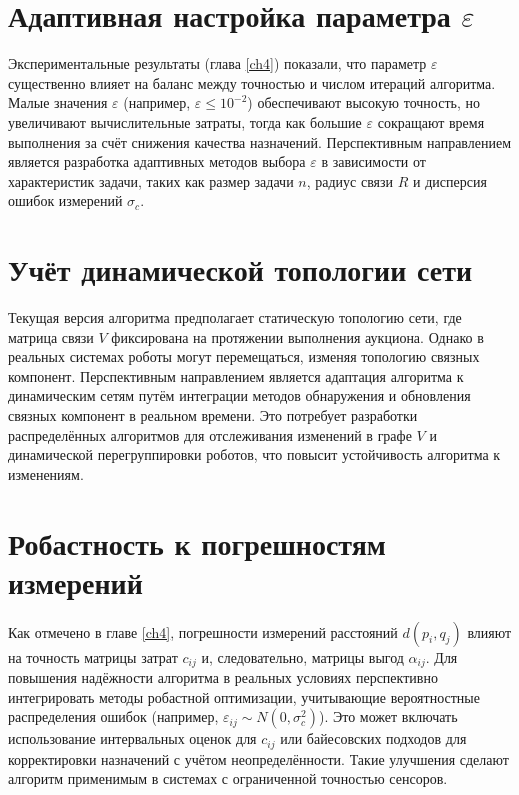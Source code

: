 \section{Адаптивная настройка параметра $\varepsilon$}
Экспериментальные результаты (глава \ref{ch4}) показали, что параметр $\varepsilon$ существенно влияет на баланс между точностью и числом итераций алгоритма. Малые значения $\varepsilon$ (например, $\varepsilon \leqslant 10^{-2}$) обеспечивают высокую точность, но увеличивают вычислительные затраты, тогда как большие $\varepsilon$ сокращают время выполнения за счёт снижения качества назначений. Перспективным направлением является разработка адаптивных методов выбора $\varepsilon$ в зависимости от характеристик задачи, таких как размер задачи $n$, радиус связи $R$ и дисперсия ошибок измерений $\sigma_c$. 

\section{Учёт динамической топологии сети}
Текущая версия алгоритма предполагает статическую топологию сети, где матрица связи $V$ фиксирована на протяжении выполнения аукциона. Однако в реальных системах роботы могут перемещаться, изменяя топологию связных компонент. Перспективным направлением является адаптация алгоритма к динамическим сетям путём интеграции методов обнаружения и обновления связных компонент в реальном времени. Это потребует разработки распределённых алгоритмов для отслеживания изменений в графе $V$ и динамической перегруппировки роботов, что повысит устойчивость алгоритма к изменениям.

\section{Робастность к погрешностям измерений}
Как отмечено в главе \ref{ch4}, погрешности измерений расстояний $d(p_i, q_j)$ влияют на точность матрицы затрат $c_{ij}$ и, следовательно, матрицы выгод $\alpha_{ij}$. Для повышения надёжности алгоритма в реальных условиях перспективно интегрировать методы робастной оптимизации, учитывающие вероятностные распределения ошибок (например, $\varepsilon_{ij} \sim N(0, \sigma_c^2)$). Это может включать использование интервальных оценок для $c_{ij}$ или байесовских подходов для корректировки назначений с учётом неопределённости. Такие улучшения сделают алгоритм применимым в системах с ограниченной точностью сенсоров.



